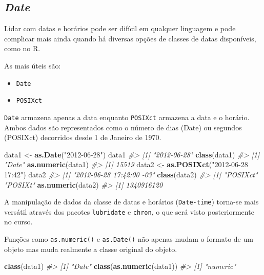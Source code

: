 \documentclass[]{book}
\newenvironment{Shaded}{\begin{snugshade}}{\end{snugshade}}
\newcommand{\KeywordTok}[1]{\textcolor[rgb]{0.13,0.29,0.53}{\textbf{#1}}}
\newcommand{\StringTok}[1]{\textcolor[rgb]{0.31,0.60,0.02}{#1}}
\newcommand{\CommentTok}[1]{\textcolor[rgb]{0.56,0.35,0.01}{\textit{#1}}}
\newcommand{\NormalTok}[1]{#1}
\begin{document}
\subsection{\texorpdfstring{\emph{Date}}{Date}}\label{date}

Lidar com datas e horários pode ser difícil em qualquer linguagem e pode
complicar mais ainda quando há diversas opções de classes de datas
disponíveis, como no R.

As mais úteis são:

\begin{itemize}
\item
  \texttt{Date}
\item
  \texttt{POSIXct}
\end{itemize}

\texttt{Date} armazena apenas a data enquanto \texttt{POSIXct} armazena
a data e o horário. Ambos dados são representados como o número de dias
(Date) ou segundos (POSIXct) decorridos desde 1 de Janeiro de 1970.

\begin{Shaded}
\begin{Highlighting}[]
\NormalTok{data1 <-}\StringTok{ }\KeywordTok{as.Date}\NormalTok{(}\StringTok{"2012-06-28"}\NormalTok{)}
\NormalTok{data1}
\CommentTok{#> [1] "2012-06-28"}
\KeywordTok{class}\NormalTok{(data1)}
\CommentTok{#> [1] "Date"}
\KeywordTok{as.numeric}\NormalTok{(data1)}
\CommentTok{#> [1] 15519}
\NormalTok{data2 <-}\StringTok{ }\KeywordTok{as.POSIXct}\NormalTok{(}\StringTok{"2012-06-28 17:42"}\NormalTok{)}
\NormalTok{data2}
\CommentTok{#> [1] "2012-06-28 17:42:00 -03"}
\KeywordTok{class}\NormalTok{(data2)}
\CommentTok{#> [1] "POSIXct" "POSIXt"}
\KeywordTok{as.numeric}\NormalTok{(data2)}
\CommentTok{#> [1] 1340916120}
\end{Highlighting}
\end{Shaded}

A manipulação de dados da classe de datas e horários
(\texttt{Date-time}) torna-se mais versátil através dos pacotes
\texttt{lubridate} e \texttt{chron}, o que será visto posteriormente no
curso.

Funções como \texttt{as.numeric()} e \texttt{as.Date()} não apenas mudam
o formato de um objeto mas muda realmente a classe original do objeto.

\begin{Shaded}
\begin{Highlighting}[]
\KeywordTok{class}\NormalTok{(data1)}
\CommentTok{#> [1] "Date"}
\KeywordTok{class}\NormalTok{(}\KeywordTok{as.numeric}\NormalTok{(data1))}
\CommentTok{#> [1] "numeric"}
\end{Highlighting}
\end{Shaded}
\end{document}
